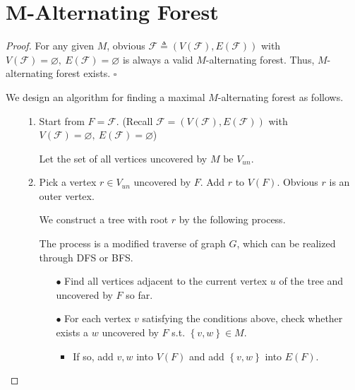 \documentclass{article}
\newcommand{\whiteqed}{\hfill $\square$\par}
\newcommand{\set}[1]{\left\{#1\right\}}
\newcommand{\bd}[1]{\boldsymbol{#1}}
\begin{document}
\section{$\bd{M}$-Alternating Forest}
\vspace{1em}
\begin{proof}
    For any given $M$, obvious $\mathcal{F}\triangleq(V(\mathcal{F}),E(\mathcal{F}))$ with $V(\mathcal{F})=\varnothing,\ E(\mathcal{F})=\varnothing$ is always a valid $M$-alternating forest. Thus, $M$-alternating forest exists. \whiteqed
    
    \vspace{1em} \hspace{1.3em}
    We design an algorithm for finding a maximal $M$-alternating forest as follows.
    
    \vspace{-0.5em}
    \begin{itemize}
        \item[] \begin{enumerate}
            \item Start from $F=\mathcal{F}$. (Recall $\mathcal{F}=(V(\mathcal{F}),E(\mathcal{F}))$ with $V(\mathcal{F})=\varnothing,\ E(\mathcal{F})=\varnothing$)
            
            Let the set of all vertices uncovered by $M$ be $V_{un}$.
            \item Pick a vertex $r\in V_{un}$ uncovered by $F$. Add $r$ to $V(F)$. Obvious $r$ is an outer vertex.
            
            We construct a tree with root $r$ by the following process. 
            
            The process is a modified traverse of graph $G$, which can be realized through DFS or BFS.
            
        \begin{itemize}
            \item[$\bullet$] Find all vertices adjacent to the current vertex $u$ of the tree and uncovered by $F$ so far.
            
            \item[$\bullet$] For each vertex $v$ satisfying the conditions above, check whether exists a $w$ uncovered by $F$ s.t. $\set{v,w}\in M$. 
            
            \begin{itemize}
                \item If so, add $v,w$ into $V(F)$ and add $\set{v,w}$ into $E(F)$. 
                

\end{itemize}
\end{itemize}
\end{enumerate}
\end{itemize}
\end{proof}
\end{document}
